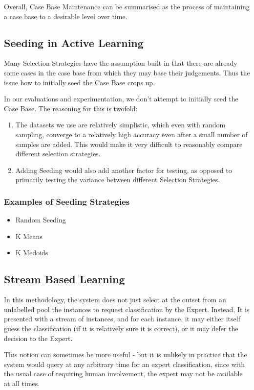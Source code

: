 \documentclass[a4paper,11pt]{report}
\begin{document}
Overall, Case Base Maintenance can be summarised as the process of maintaining a case base to a desirable level over time.

\subsection{Seeding in Active Learning}
Many Selection Strategies have the assumption built in that there are already some cases in the case base from which they may base their judgements. Thus the issue how to initially seed the Case Base crops up.

In our evaluations and experimentation, we don't attempt to initially seed the Case Base. The reasoning for this is twofold: 
\begin{enumerate}
	\item The datasets we use are relatively simplistic, which even with random sampling, converge to a relatively high accuracy even after a small number of samples are added. This would make it very difficult to reasonably compare different selection strategies. 
	\item Adding Seeding would also add another factor for testing, as opposed to primarily testing the variance between different Selection Strategies.
\end{enumerate}

\subsubsection{Examples of Seeding Strategies}
\begin{itemize}
	\item Random Seeding
	\item K Means
	\item K Medoids
\end{itemize}

\subsection{Stream Based Learning}
In this methodology, the system does not just select at the outset from an unlabelled pool the instances to request classification by the Expert. Instead, It is presented with a stream of instances, and for each instance, it may either itself guess the classification (if it is relatively sure it is correct), or it may defer the decision to the Expert.

This notion can sometimes be more useful - but it is unlikely in practice that the system would query at any arbitrary time for an expert classification, since with the usual case of requiring human involvement, the expert may not be available at all times.
\end{document}
